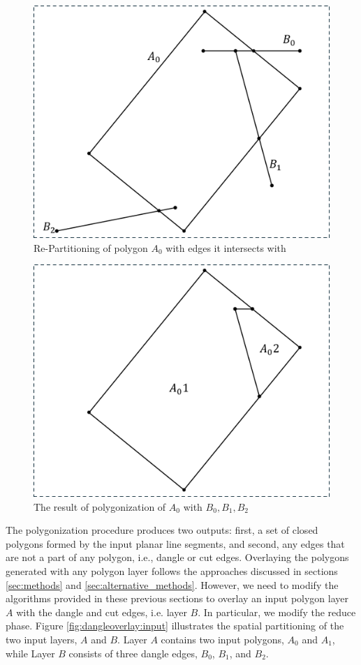 \begin{figure}[tb]
	\centering
	\includegraphics[width=0.75 \linewidth ]{chapter2/model/DangleOverlay2.pdf}
	\caption{Re-Partitioning of polygon $A_0$ with edges it intersects with}
	\label{fig:dangleoverlay:inter}
\end{figure}

\begin{figure}[tb]
	\centering
	\includegraphics[width=0.75 \linewidth ]{chapter2/model/DangleOverlay3.pdf}
	\caption{The result of polygonization of $A_0$ with $B_0, B_1, B_2$}
	\label{fig:dangleoverlay:result}
\end{figure}

The polygonization procedure produces two outputs: first, a set of closed polygons formed by the input planar line segments, and second, any edges that are not 
a part of any polygon, i.e., dangle or cut edges. 
Overlaying the polygons generated with any polygon layer follows the approaches discussed in sections \ref{sec:methods} and \ref{sec:alternative_methods}.
However, we need to modify the algorithms provided in these previous sections to overlay an input polygon layer $A$ with the dangle and cut edges, i.e. layer 
$B$. In particular, we modify the reduce phase.
Figure \ref{fig:dangleoverlay:input} illustrates the spatial partitioning of the two input layers, $A$ and $B$. Layer $A$ contains two input polygons, $A_0$ and 
$A_1$, while Layer $B$ consists of three dangle edges, $B_0$, $B_1$, and $B_2$.


